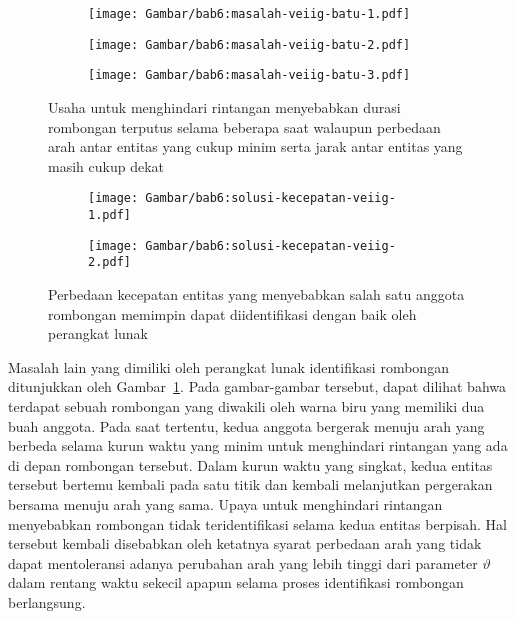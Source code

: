\begin{figure}[h!]
    \centering
    \captionsetup{width=.8\textwidth}
    \begin{subfigure}[t]{0.25\textwidth}
        \centering
        \texttt{[image: Gambar/bab6:masalah-veiig-batu-1.pdf]}
    \end{subfigure}
    \begin{subfigure}[t]{0.275\textwidth}
        \centering
        \texttt{[image: Gambar/bab6:masalah-veiig-batu-2.pdf]}
    \end{subfigure}
    \begin{subfigure}[t]{0.25\textwidth}
        \centering
        \texttt{[image: Gambar/bab6:masalah-veiig-batu-3.pdf]}
    \end{subfigure}
    \caption[Masalah menghindari rintangan]{Usaha untuk menghindari rintangan menyebabkan durasi rombongan terputus selama beberapa saat walaupun perbedaan arah antar entitas yang cukup minim serta jarak antar entitas yang masih cukup dekat}
    \label{bab6:masalah-rintangan-veiig}
\end{figure}

\begin{figure}[h]
    \centering
    \captionsetup{width=.7\textwidth}
    \begin{subfigure}[h]{0.235\textwidth}
        \centering
        \texttt{[image: Gambar/bab6:solusi-kecepatan-veiig-1.pdf]}
    \end{subfigure}
    \begin{subfigure}[h]{0.235\textwidth}
        \centering
        \texttt{[image: Gambar/bab6:solusi-kecepatan-veiig-2.pdf]}
    \end{subfigure}
    \caption[Penyelesaian masalah beda kecepatan pada data VEIIG]{Perbedaan kecepatan entitas yang menyebabkan salah satu anggota rombongan memimpin dapat diidentifikasi dengan baik oleh perangkat lunak}
    \label{bab6:solusi-beda-kecepatan-veiig}
\end{figure}

Masalah lain yang dimiliki oleh perangkat lunak identifikasi rombongan ditunjukkan oleh Gambar~\ref{bab6:masalah-rintangan-veiig}. Pada gambar-gambar tersebut, dapat dilihat bahwa terdapat sebuah rombongan yang diwakili oleh warna biru yang memiliki dua buah anggota. Pada saat tertentu, kedua anggota bergerak menuju arah yang berbeda selama kurun waktu yang minim untuk menghindari rintangan yang ada di depan rombongan tersebut. Dalam kurun waktu yang singkat, kedua entitas tersebut bertemu kembali pada satu titik dan kembali melanjutkan pergerakan bersama menuju arah yang sama. Upaya untuk menghindari rintangan menyebabkan rombongan tidak teridentifikasi selama kedua entitas berpisah. Hal tersebut kembali disebabkan oleh ketatnya syarat perbedaan arah yang tidak dapat mentoleransi adanya perubahan arah yang lebih tinggi dari parameter $\vartheta$ dalam rentang waktu sekecil apapun selama proses identifikasi rombongan berlangsung.

